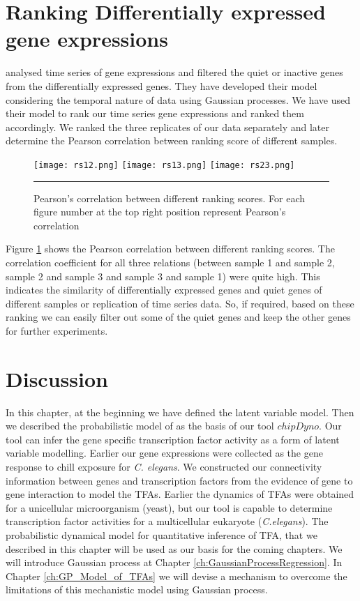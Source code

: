 \section{Ranking Differentially expressed gene expressions}
\cite{Kalaitzis:2011} analysed time series of gene expressions and filtered the quiet or inactive genes from the differentially expressed genes. They have developed their model considering the temporal nature of data using Gaussian processes. We have used their model to rank our time series gene expressions and ranked them accordingly. We ranked the three replicates of our data separately and later determine the Pearson correlation between ranking score of different samples.
\begin{figure}
	\centering
		\texttt{[image: rs12.png]}
		\texttt{[image: rs13.png]}
		\texttt{[image: rs23.png]}
		\rule{35em}{0.5pt}
	\caption[Pearson's correlation between different ranking scores]
		{Pearson's correlation between different ranking scores. For each figure number at the top right position represent Pearson's correlation}
	\label{fig:ranking_scores}
\end{figure}

Figure \ref{fig:ranking_scores} shows the Pearson correlation between different ranking scores. The correlation coefficient for all three relations (between sample 1 and sample 2, sample 2 and sample 3 and sample 3 and sample 1) were quite high. This indicates the similarity of differentially expressed genes and quiet genes of different samples or replication of time series data. So, if required, based on these ranking we can easily filter out some of the quiet genes and keep the other genes for further experiments.

\section{Discussion}
In this chapter, at the beginning we have defined the latent variable model. Then we described the probabilistic model of \cite{Sanguinetti:2006} as the basis of our tool $chipDyno$. Our tool can infer the gene specific transcription factor activity as a form of latent variable modelling. Earlier our gene expressions were collected as the gene response to chill exposure for \textit{C. elegans}. We constructed our connectivity information between genes and transcription factors from the evidence of gene to gene interaction to model the TFAs. Earlier the dynamics of TFAs were obtained for a unicellular microorganism (yeast), but our tool is capable to determine transcription factor activities for a multicellular eukaryote (\textit{C.elegans}).
The probabilistic dynamical model for quantitative inference of TFA, that we described in this chapter will be used as our basis for the coming chapters. We will introduce Gaussian process at Chapter \ref{ch:GaussianProcessRegression}. In Chapter \ref{ch:GP_Model_of_TFAs} we will devise a mechanism to overcome the limitations of this mechanistic model using Gaussian process.

